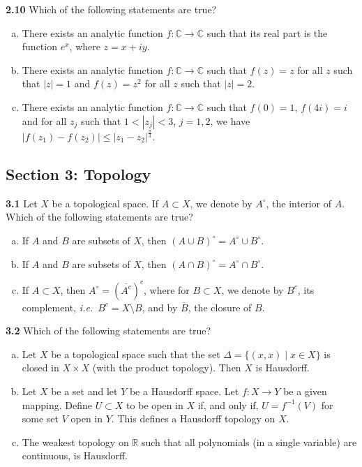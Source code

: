 \documentclass[11pt,a4paper]{article}
\newcommand{\R}{\mathbb{R}}
\newcommand{\C}{\mathbb{C}}
\newcommand{\examsec}[1]{%
  \subsection*{#1}
  \vspace{-2pt}
}
\newcommand{\qitem}[1]{\par\medskip\noindent\textbf{#1}\hspace{0.5em}}
\begin{document}
\qitem{2.10} Which of the following statements are true?
\begin{enumerate}[a.]
  \item There exists an analytic function $f : \C \to \C$ such that its real part is the function $e^x$, where $z = x + iy$.
  \item There exists an analytic function $f : \C \to \C$ such that $f(z) = z$ for all $z$ such that $|z| = 1$ and $f(z) = z^2$ for all $z$ such that $|z| = 2$.
  \item There exists an analytic function $f : \C \to \C$ such that $f(0) = 1$, $f(4i) = i$ and for all $z_j$ such that $1 < |z_j| < 3$, $j = 1, 2$, we have $|f(z_1) - f(z_2)| \le |z_1 - z_2|^{\frac{\pi}{3}}$.
\end{enumerate}

\examsec{Section 3: Topology}

\qitem{3.1} Let $X$ be a topological space. If $A \subset X$, we denote by $A^\circ$, the interior of $A$. Which of the following statements are true?
\begin{enumerate}[a.]
  \item If $A$ and $B$ are subsets of $X$, then $(A \cup B)^\circ = A^\circ \cup B^\circ$.
  \item If $A$ and $B$ are subsets of $X$, then $(A \cap B)^\circ = A^\circ \cap B^\circ$.
  \item If $A \subset X$, then $A^\circ = (\overline{A^c})^c$, where for $B \subset X$, we denote by $B^c$, its complement, \emph{i.e.}\ $B^c = X \setminus B$, and by $\overline{B}$, the closure of $B$.
\end{enumerate}

\qitem{3.2} Which of the following statements are true?
\begin{enumerate}[a.]
  \item Let $X$ be a topological space such that the set $\Delta = \{(x, x) \mid x \in X\}$ is closed in $X \times X$ (with the product topology). Then $X$ is Hausdorff.
  \item Let $X$ be a set and let $Y$ be a Hausdorff space. Let $f : X \to Y$ be a given mapping. Define $U \subset X$ to be open in $X$ if, and only if, $U = f^{-1}(V)$ for some set $V$ open in $Y$. This defines a Hausdorff topology on $X$.
  \item The weakest topology on $\R$ such that all polynomials (in a single variable) are continuous, is Hausdorff.
\end{enumerate}
\end{document}
